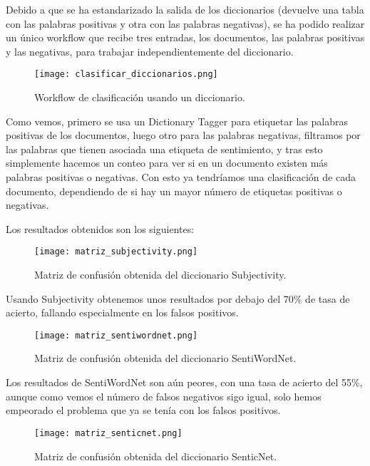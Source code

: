 Debido a que se ha estandarizado la salida de los diccionarios (devuelve una tabla con las palabras positivas y otra con las palabras negativas), se ha podido realizar un único workflow que recibe tres entradas, los documentos, las palabras positivas y las negativas, para trabajar independientemente del diccionario.

\begin{figure}[H]
	\centering
	\texttt{[image: clasificar\_diccionarios.png]}
	\caption{Workflow de clasificación usando un diccionario.}
	\label{fig:clasificar_diccionarios}
\end{figure}

Como vemos, primero se usa un Dictionary Tagger para etiquetar las palabras positivas de los documentos, luego otro para las palabras negativas, filtramos por las palabras que tienen asociada una etiqueta de sentimiento, y tras esto simplemente hacemos un conteo para ver si en un documento existen más palabras positivas o negativas. Con esto ya tendríamos una clasificación de cada documento, dependiendo de si hay un mayor número de etiquetas positivas o negativas.

Los resultados obtenidos son los siguientes:

\begin{figure}[H]
	\centering
	\texttt{[image: matriz\_subjectivity.png]}
	\caption{Matriz de confusión obtenida del diccionario Subjectivity.}
	\label{fig:matriz_subjectivity}
\end{figure}

Usando Subjectivity obtenemos unos resultados por debajo del 70\% de tasa de acierto, fallando especialmente en los falsos positivos.

\begin{figure}[H]
	\centering
	\texttt{[image: matriz\_sentiwordnet.png]}
	\caption{Matriz de confusión obtenida del diccionario SentiWordNet.}
	\label{fig:matriz_sentiwordnet}
\end{figure}

Los resultados de SentiWordNet son aún peores, con una tasa de acierto del 55\%, aunque como vemos el número de falsos negativos sigo igual, solo hemos empeorado el problema que ya se tenía con los falsos positivos.

\begin{figure}[H]
	\centering
	\texttt{[image: matriz\_senticnet.png]}
	\caption{Matriz de confusión obtenida del diccionario SenticNet.}
	\label{fig:matriz_senticnet}
\end{figure}

